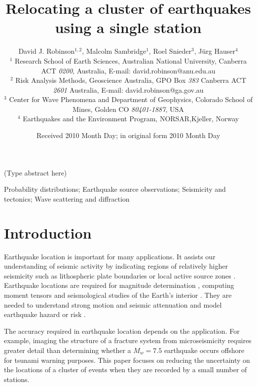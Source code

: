 \documentclass[extra]{gji}
\title{Relocating a cluster of earthquakes using a single station}
\author[D.J. Robinson, M. Sambridge, R. Snieder and J Hauser]
  {David J. Robinson$^{1,2}$, Malcolm Sambridge$^{1}$, Roel Snieder$^{3}$, J\"urg Hauser$^{4}$ \\
  $^1$ Research School of Earth Sciences, Australian National
    University, Canberra ACT \emph{0200}, Australia, E-mail: david.robinson@anu.edu.au \\
$^2$  Risk Analysis Methods, Geoscience Australia, GPO Box \emph{383} Canberra ACT \emph{2601} Australia, E-mail: david.robinson@ga.gov.au\\
$^3$ Center for Wave Phenomena and Department of Geophysics, Colorado School of Mines, Golden CO \emph{80401-1887}, USA \\
$^4$ Earthquakes and the Environment Program, NORSAR,Kjeller, Norway}
\date{Received 2010 Month Day; in original form 2010 Month Day}
\begin{document}
\label{firstpage}

\maketitle


\begin{summary}
(Type abstract here)
\end{summary}

\begin{keywords}
 Probability distributions; Earthquake source observations; Seismicity and tectonics; Wave scattering and diffraction
\end{keywords}

\section{Introduction}

Earthquake location is important for many applications. It assists
our understanding of seismic activity by indicating regions of
relatively higher seismicity such as lithospheric plate boundaries
\citep[e.g., ][]{dr_Sykes67a, dr_Isacks68a, dr_Stein02a} or local
active source zones \citep[e.g., ][]{dr_Gutenberg44a,
dr_Giardini03a}. Earthquake locations are required for  magnitude
determination \citep[e.g., ][]{dr_Richter35a, dr_Gutenberg45a},
computing moment tensors \citep[e.g., ][]{dr_Sipkin02a} and
seismological studies of the Earth's interior \citep[e.g.,
][]{dr_Spencer80a, dr_Kennett95a, dr_Curtis02a, dr_Kennett04a}. They
are needed to understand strong motion and seismic attenuation
\citep[e.g., ][]{dr_Toro97a, dr_Campbell03a}
 and model earthquake hazard or risk
\citep[e.g., ][]{dr_Frankel00a, dr_Stirling02a, dr_Robinson06b}.

The accuracy required in earthquake location depends on the
application. For example, imaging the structure of a fracture system
from microseismicity requires greater detail than determining
whether a $M_w=7.5$ earthquake occurs offshore for tsunami warning
purposes. This paper focuses on reducing the uncertainty on the
locations of a cluster of events when they are recorded by a small
number of stations.
\end{document}
